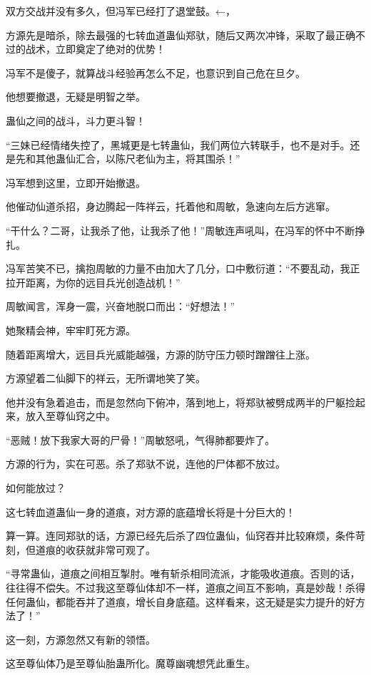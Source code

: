 
\begin{this_body}

双方交战并没有多久，但冯军已经打了退堂鼓。←，

方源先是暗杀，除去最强的七转血道蛊仙郑驮，随后又两次冲锋，采取了最正确不过的战术，立即奠定了绝对的优势！

冯军不是傻子，就算战斗经验再怎么不足，也意识到自己危在旦夕。

他想要撤退，无疑是明智之举。

蛊仙之间的战斗，斗力更斗智！

“三妹已经情绪失控了，黑城更是七转蛊仙，我们两位六转联手，也不是对手。还是先和其他蛊仙汇合，以陈尺老仙为主，将其围杀！”

冯军想到这里，立即开始撤退。

他催动仙道杀招，身边腾起一阵祥云，托着他和周敏，急速向左后方逃窜。

“干什么？二哥，让我杀了他，让我杀了他！”周敏连声吼叫，在冯军的怀中不断挣扎。

冯军苦笑不已，擒抱周敏的力量不由加大了几分，口中敷衍道：“不要乱动，我正拉开距离，为你的远目兵光创造战机！”

周敏闻言，浑身一震，兴奋地脱口而出：“好想法！”

她聚精会神，牢牢盯死方源。

随着距离增大，远目兵光威能越强，方源的防守压力顿时蹭蹭往上涨。

方源望着二仙脚下的祥云，无所谓地笑了笑。

他并没有急着追击，而是忽然向下俯冲，落到地上，将郑驮被劈成两半的尸躯捡起来，放入至尊仙窍之中。

“恶贼！放下我家大哥的尸骨！”周敏怒吼，气得肺都要炸了。

方源的行为，实在可恶。杀了郑驮不说，连他的尸体都不放过。

如何能放过？

这七转血道蛊仙一身的道痕，对方源的底蕴增长将是十分巨大的！

算一算。连同郑驮的话，方源已经先后杀了四位蛊仙，仙窍吞并比较麻烦，条件苛刻，但道痕的收获就非常可观了。

“寻常蛊仙，道痕之间相互掣肘。唯有斩杀相同流派，才能吸收道痕。否则的话，往往得不偿失。不过我这至尊仙体却不一样，道痕之间互不影响，真是妙哉！杀得任何蛊仙，都能吞并了道痕，增长自身底蕴。这样看来，这无疑是实力提升的好方法了！”

这一刻，方源忽然又有新的领悟。

这至尊仙体乃是至尊仙胎蛊所化。魔尊幽魂想凭此重生。


\end{this_body}
